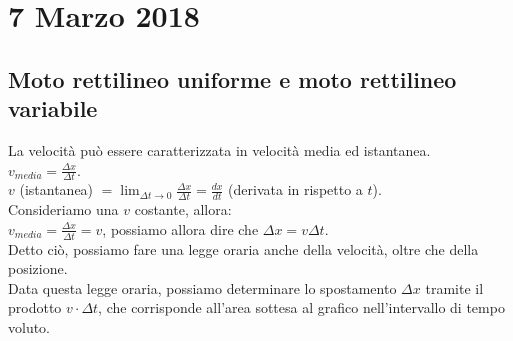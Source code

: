 \documentclass{article}
\begin{document}
\section*{7 Marzo 2018}
\subsection*{Moto rettilineo uniforme e moto rettilineo variabile}
La velocit\`{a} pu\`{o} essere caratterizzata in velocit\`{a} media ed istantanea.\\
$v_{media}=\frac{\Delta x}{\Delta t}$.\\
$v$ (istantanea) $=\lim_{\Delta t\to 0}\frac{\Delta x}{\Delta t}=\frac{dx}{dt}$ (derivata in rispetto a $t$).\\
Consideriamo una $v$ costante, allora:\\
$v_{media}=\frac{\Delta x}{\Delta t} = v$, possiamo allora dire che $\Delta x = v\Delta t$.\\
Detto ci\`{o}, possiamo fare una legge oraria anche della velocit\`{a}, oltre che della posizione.\\
Data questa legge oraria, possiamo determinare lo spostamento $\Delta x$ tramite il prodotto $v\cdot \Delta t$, che corrisponde
all'area sottesa al grafico nell'intervallo di tempo voluto.
\end{document}
